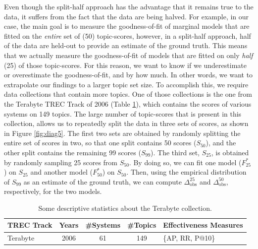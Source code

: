 Even though the split-half approach has the advantage that it remains true to the data, it suffers from the fact that the data are being halved. For example, in our case, the main goal is to measure the goodness-of-fit of marginal models that are fitted on the \textit{entire} set of (50) topic-scores, however, in a split-half approach, half of the data are held-out to provide an estimate of the ground truth. This means that we actually measure the goodness-of-fit of models that are fitted on only \textit{half} (25) of those topic-scores. For this reason, we want to know if we underestimate or overestimate the goodness-of-fit, and by how much. In other words, we want to extrapolate our findings to a larger topic set size. To accomplish this, we require data collections that contain more topics. One of those collections is the one from the Terabyte TREC Track of 2006 (Table \ref{tab:dataset-descriptive-stats-terabyte}), which contains the scores of various systems on 149 topics. The large number of topic-scores that is present in this collection, allows us to repeatedly split the data in three sets of scores, as shown in Figure \ref{fig:diag5}. The first two sets are obtained by randomly splitting the entire set of scores in two, so that one split contains 50 scores ($S_{50}$), and the other split contains the remaining 99 scores ($S_{99}$). The third set, $S_{25}$, is obtained by randomly sampling 25 scores from $S_{50}$. By doing so, we can fit one model ($F_{25}^*$) on $S_{25}$ and another model ($F_{50}^*$) on $S_{50}$. Then, using the empirical distribution of $S_{99}$ as an estimate of the ground truth, we can compute $\Delta_\text{obs}^{25}$ and $\Delta_\text{obs}^{50}$, respectively, for the two models.

\begin{table}[t]
	\centering
	\begin{tabular}{l c c c l}
		\toprule
		TREC Track & Years & \#Systems & \#Topics & Effectiveness Measures \\
		\midrule
		Terabyte & 2006 & 61 & 149 & \{AP, RR, P@10\} \\
		\bottomrule
	\end{tabular}
	\caption{Some descriptive statistics about the Terabyte collection.}
	\label{tab:dataset-descriptive-stats-terabyte}
\end{table} 

